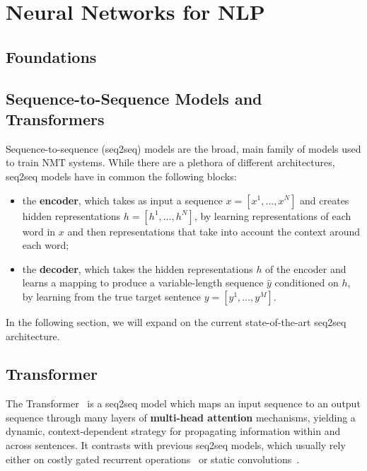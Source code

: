 \section{Neural Networks for NLP}
\label{sec:nmt}

\subsection{Foundations}

\subsection{Sequence-to-Sequence Models and Transformers}
\label{sec:transformer_bg}

Sequence-to-sequence (seq2seq) models are the broad, main family of models
used to train NMT systems. While there are a plethora of different architectures,
seq2seq models have in common the following blocks:

\begin{itemize}
  \item the {\bf encoder}, which takes as input a sequence $x=[x^1,
          \dots, x^N]$ and creates hidden representations $h=[h^1, \dots,
          h^N]$, by learning representations of each word in $x$ and then
        representations that take into account the context around each word;
  \item the {\bf decoder}, which takes the hidden representations
        $h$ of the encoder and learns a mapping to produce a
        variable-length sequence $\hat{y}$ conditioned on $h$, by
        learning from the true target sentence $y=[y^1, \dots, y^M]$.
\end{itemize}

In the following section, we will expand on the current
state-of-the-art seq2seq architecture.

\subsection{Transformer}

The Transformer~\citep{vaswani2017attention} is a seq2seq model which
maps an input sequence to an output sequence through many layers of
\textbf{multi-head attention} mechanisms, yielding a dynamic,
context-dependent strategy for propagating information within and
across sentences. It contrasts with previous seq2seq models, which
usually rely either on costly gated recurrent operations~\citep[often
  LSTMs:][]{bahdanau2014neural,luong2015effective} or static
convolutions~\citep{convseq}.

